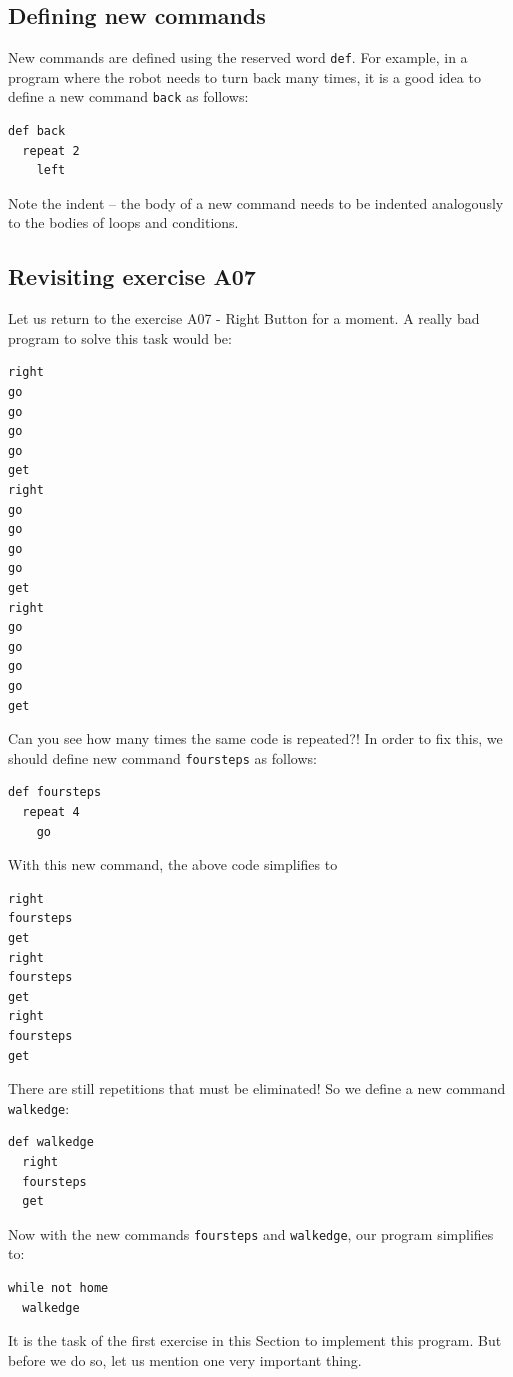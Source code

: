 \documentclass[article,A4,12pt]{llncs}
\begin{document}
{{{{\subsection{Defining new commands}

New commands are defined using the reserved word 
{\tt def}. For example, in a program where the robot needs to turn back
many times, it is a good idea to define a new command {\tt back}
as follows:

\begin{verbatim}
def back
  repeat 2
    left
\end{verbatim}
Note the indent -- the body of a new command needs to be indented 
analogously to the bodies of loops and conditions.

\subsection{Revisiting exercise A07}

Let us return to the exercise A07 - Right Button for a moment.
A really bad program to solve this task would be:

{\small
\begin{verbatim}
right
go
go
go
go 
get
right
go
go
go
go 
get
right
go
go
go
go
get
\end{verbatim}
}
\noindent
Can you see how many times the same code is repeated?! In order to fix this, 
we should define new command {\tt foursteps} as
follows:

{\small
\begin{verbatim}
def foursteps
  repeat 4
    go
\end{verbatim}
}
\noindent
With this new command, the above code simplifies to 

{\small
\begin{verbatim}
right
foursteps
get
right
foursteps
get
right
foursteps
get
\end{verbatim}
}
\noindent
There are still repetitions that must be eliminated! So we define a new command 
{\tt walkedge}:

{\small
\begin{verbatim}
def walkedge
  right
  foursteps
  get
\end{verbatim}
}
\noindent
Now with the new commands {\tt foursteps} and
{\tt walkedge}, our program simplifies to:

{\small
\begin{verbatim}
while not home
  walkedge
\end{verbatim}
}
\noindent
It is the task of the first exercise in this Section to implement this program. But before we 
do so, let us mention one very important thing.

}}}}
\end{document}
